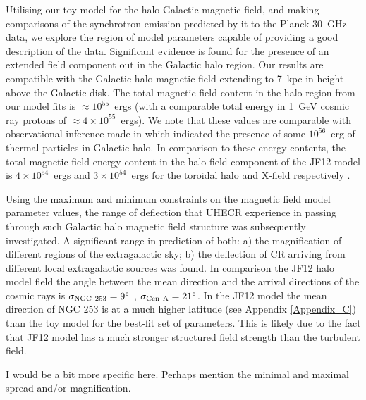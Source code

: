 \documentclass[usenatbib]{mnras}
\newcommand{\Arjen}[1]{{\color{brown}#1}}
\begin{document}
Utilising our toy model for the halo Galactic magnetic field, and making comparisons of the synchrotron emission predicted by it to the Planck 30~GHz data, we explore the region of model parameters capable of providing a good description of the data. Significant evidence is found for the presence of an extended field component out in the Galactic halo region. Our results are compatible with the Galactic halo magnetic field extending to 7~kpc in height above the Galactic disk. The total magnetic field content in the halo region from our model fits is $\approx 10^{55}$~ergs (with a comparable total energy in 1~GeV cosmic ray protons of $\approx 4\times 10^{55}$~ergs). We note that these values are comparable with observational inference made in \cite{eROSITA} which indicated the presence of some $10^{56}$~erg of thermal particles in Galactic halo.
In comparison to these energy contents, the total magnetic field energy content in the halo field component of the JF12 model is $4\times 10^{54}$~ergs and $3\times  10^{54}$~ergs for the toroidal halo and X-field respectively \cite{Taylor_2019}.

Using the maximum and minimum constraints on the magnetic field model parameter values, the range of deflection that UHECR experience in passing through such Galactic halo magnetic field structure was subsequently investigated. A significant range in prediction of both: a) the magnification of different regions of the extragalactic sky; b) the deflection of CR arriving from different local extragalactic sources was found.
In comparison the JF12 halo model field the angle between the mean direction and the arrival directions of the cosmic rays is $\sigma_{\rm NGC~253} = 9^{\circ}$ , {$\sigma_{\rm Cen~A} = 21^{\circ}$}. In the JF12 model the mean direction of NGC 253 is at a much higher latitude (see Appendix \ref{Appendix_C}) \cite{Arjen_2021} than the toy model for the best-fit set of parameters. This is likely due to the fact that JF12 model has a much stronger structured field strength than the turbulent field.

\Arjen{I would be a bit more specific here. Perhaps mention the minimal and maximal spread and/or magnification.}



\end{document}
